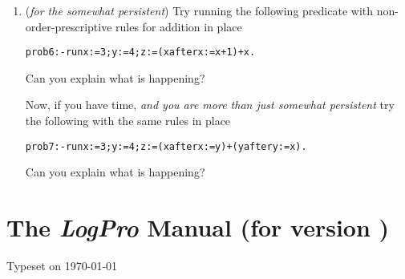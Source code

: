 \documentclass{article}
\def\LOGPRO{{\ttfamily\slshape LogPro}\xspace}
\newenvironment{smalltt}{\begin{small}\begin{alltt}}{\end{alltt}\end{small}}
\begin{document}
\begin{enumerate}
\begin{enumerate}
\item ({\it for the somewhat persistent\/})
Try running the following predicate
with non-order-prescriptive rules for addition in place
\begin{smalltt}
        prob6 :- run x:=3; y:=4; z:=(x after x:=x+1)+x.
\end{smalltt}
Can you explain what is happening?

Now, if you have time, {\it and you are more than just somewhat persistent\/} try 
the following with the same rules in place
\begin{smalltt}
        prob7 :- run x:=3; y:=4; z:=(x after x:=y)+(y after y:=x).
\end{smalltt}
Can you explain what is happening?

\end{enumerate}
\end{enumerate}
\newpage
\appendix
\section{The \LOGPRO Manual (for version \LOGPROVERSION)}\label{Manual}
\newcommand{\sect}[1]{\subsection{#1}}
\newcommand{\subsect}[1]{\subsubsection{#1}}

\clearpage
{}
\newpage
\tableofcontents

Typeset on \today
\end{document}
